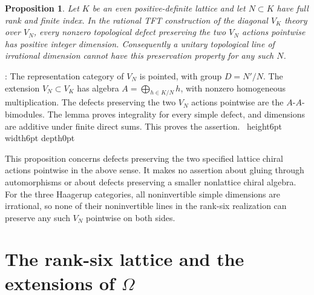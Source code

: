 \documentclass[leqno]{article}
\newcommand{\qed}{\hfill \vrule height6pt  width6pt depth0pt}
\newtheorem{prop}[thm]{Proposition}
\newenvironment{proof}[1][]{\noindent {\it Proof #1} : }{\hbox{~}\qed
\smallskip
}
\numberwithin{equation}{section}
\begin{document}
\begin{prop}
\label{prop:no-pointwise-finite-index-lattice-preservation}
Let $K$ be an even positive-definite lattice and let $N \subset K$ have full rank and finite index. In the rational TFT construction of the diagonal $V_K$ theory over $V_N$, every nonzero topological defect preserving the two $V_N$ actions pointwise has positive integer dimension. Consequently a unitary topological line of irrational dimension cannot have this preservation property for any such $N$.
\end{prop}

\begin{proof}
The representation category of $V_N$ is pointed, with group $D = N'/N$. The extension $V_N \subset V_K$ has algebra $A = \bigoplus_{h \in K/N} h$, with nonzero homogeneous multiplication. The defects preserving the two $V_N$ actions pointwise are the $A$-$A$-bimodules. The lemma proves integrality for every simple defect, and dimensions are additive under finite direct sums. This proves the assertion.
\end{proof}

This proposition concerns defects preserving the two specified lattice chiral actions pointwise in the above sense. It makes no assertion about gluing through automorphisms or about defects preserving a smaller nonlattice chiral algebra. For the three Haagerup categories, all noninvertible simple dimensions are irrational, so none of their noninvertible lines in the rank-six realization can preserve any such $V_N$ pointwise on both sides.

\section{The rank-six lattice and the extensions of \texorpdfstring{$\Omega$}{Omega}}
\label{sec:explicit-K}
\end{document}
